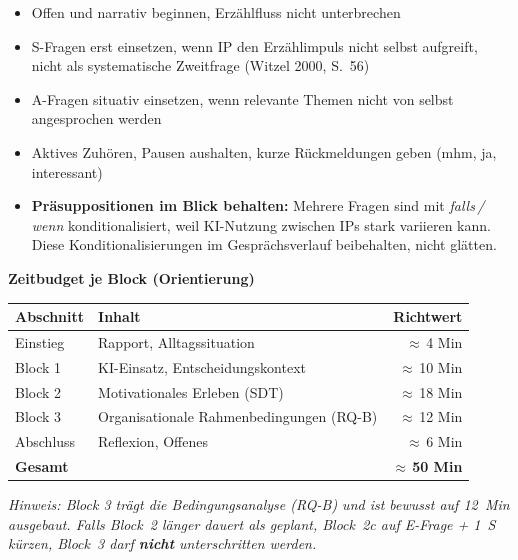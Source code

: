 \begin{itemize}[leftmargin=1.5em, itemsep=1pt, topsep=2pt]
  \item[$\rightarrow$] Offen und narrativ beginnen, Erzählfluss nicht
    unterbrechen
  \item[$\rightarrow$] S-Fragen erst einsetzen, wenn IP den Erzählimpuls
    nicht selbst aufgreift, nicht als systematische Zweitfrage
    (Witzel 2000, S.~56)
  \item[$\rightarrow$] A-Fragen situativ einsetzen, wenn relevante Themen
    nicht von selbst angesprochen werden
  \item[$\rightarrow$] Aktives Zuhören, Pausen aushalten, kurze
    Rückmeldungen geben (\glqq mhm\grqq{}, \glqq ja\grqq{},
    \glqq interessant\grqq{})
  \item[$\rightarrow$] \textbf{Präsuppositionen im Blick behalten:} Mehrere
    Fragen sind mit \textit{falls\,/\,wenn} konditionalisiert, weil KI-Nutzung
    zwischen IPs stark variieren kann. Diese Konditionalisierungen im
    Gesprächsverlauf beibehalten, nicht glätten.
\end{itemize}

\vspace{0.4em}
\noindent\textbf{Zeitbudget je Block (Orientierung)}

\vspace{0.2em}
\begin{tabularx}{\linewidth}{@{}lXr@{}}
  \toprule
  \textbf{Abschnitt} & \textbf{Inhalt} & \textbf{Richtwert} \\
  \midrule
  Einstieg  & Rapport, Alltagssituation               & $\approx$\,4 Min \\
  Block 1   & KI-Einsatz, Entscheidungskontext        & $\approx$\,10 Min \\
  Block 2   & Motivationales Erleben (SDT)             & $\approx$\,18 Min \\
  Block 3   & Organisationale Rahmenbedingungen (RQ-B)& $\approx$\,12 Min \\
  Abschluss & Reflexion, Offenes                      & $\approx$\,6 Min \\
  \midrule
  \textbf{Gesamt} &                                   & \textbf{$\approx$\,50 Min} \\
  \bottomrule
\end{tabularx}

\vspace{0.2em}
{\small\itshape Hinweis: Block 3 trägt die Bedingungsanalyse (RQ-B) und ist
  bewusst auf 12~Min ausgebaut. Falls Block~2 länger dauert als geplant,
  Block~2c auf E-Frage + 1~S kürzen, Block~3 darf \textbf{nicht} unterschritten
  werden.}

